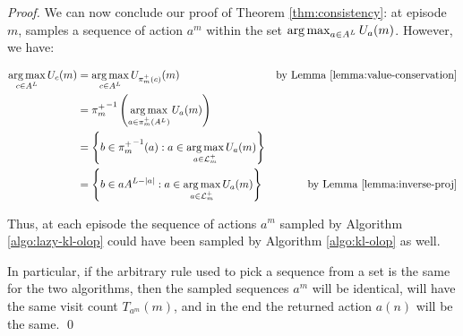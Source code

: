 \documentclass[runningheads]{llncs}
\begin{document}
\begin{proof}
We can now conclude our proof of Theorem \ref{thm:consistency}: at episode $m$, \KLOLOP samples a sequence of action $a^m$ within the set $\operatorname*{arg\,max}_{a\in A^L} U_a(m)$. 
However, we have:

\begin{align*}
    \operatorname*{arg\,max}_{c\in A^L} U_c(m) &= \operatorname*{arg\,max}_{c\in A^L} U_{\pi_m^+(c)}(m) & \text{by Lemma \ref{lemma:value-conservation}} \\
    &= {\pi_m^+}^{-1}\left(\operatorname*{arg\,max}_{a\in {\pi_m^+}(A^L)} U_{a}(m)\right) & \\
    &= \left\{b\in{\pi_m^+}^{-1}(a) : a\in \operatorname*{arg\,max}_{a\in \mathcal{L}_m^+} U_{a}(m)\right\} & \\
    &= \left\{b\in a A^{L-|a|} : a\in \operatorname*{arg\,max}_{a\in \mathcal{L}_m^+} U_{a}(m)\right\} & \text{by Lemma \ref{lemma:inverse-proj}} 
\end{align*}

Thus, at each episode the sequence of actions $a^m$ sampled by Algorithm \ref{algo:lazy-kl-olop} could have been sampled by Algorithm \ref{algo:kl-olop} as well.

In particular, if the arbitrary rule used to pick a sequence from a set is the same for the two algorithms, then the sampled sequences $a^m$ will be identical, will have the same visit count $T_{a^m}(m)$, and in the end the returned action $a(n)$ will be the same.
\qed
\end{proof}
\end{document}
